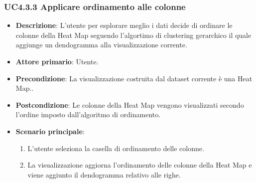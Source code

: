 \subsubsection{UC4.3.3 Applicare ordinamento alle colonne}
\label{subsec:uc4.2.1}
\begin{itemize}
    \item \textbf{Descrizione}: L’utente per esplorare meglio i dati decide di ordinare le colonne della Heat Map
                                seguendo l'algortimo di clustering gerarchico il quale aggiunge un dendogramma alla visualizzazione corrente.
	
    \item \textbf{Attore primario}: Utente.
    
    \item \textbf{Precondizione}:   La visualizzazione costruita dal dataset corrente è una Heat Map..
    \item \textbf{Postcondizione}:  Le colonne della Heat Map vengono visualizzati secondo l'ordine imposto dall'algoritmo di ordinamento.

	\item \textbf{Scenario principale}:
        \begin{enumerate}
            \item   L'utente seleziona la casella di ordinamento delle colonne.
            \item   La visualizzazione aggiorna l'ordinamento delle colonne della Heat Map 
                    e viene aggiunto il dendogramma relativo alle righe.
        \end{enumerate}
\end{itemize}


